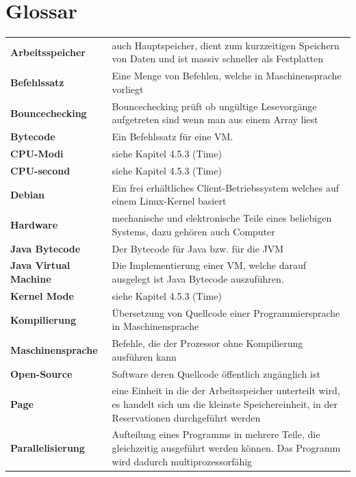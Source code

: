 \documentclass{fancydocument}
\begin{document}
\section{Glossar}
\renewcommand{\arraystretch}{1.4}
\begin{tabularx}{\linewidth}{p{6.5cm}X}
\textbf{Arbeitsspeicher}&auch Hauptspeicher, dient zum kurzzeitigen Speichern von Daten und ist massiv schneller als Festplatten\\
\textbf{Befehlssatz}&Eine Menge von Befehlen, welche in Maschinensprache vorliegt\\
\textbf{Bouncechecking}& Bouncechecking prüft ob ungültige Lesevorgänge aufgetreten sind wenn man aus einem Array liest\\
\textbf{Bytecode}&Ein Befehlssatz für eine VM.\\
\textbf{CPU-Modi}&siehe Kapitel 4.5.3 (Time)\\
\textbf{CPU-second}&siehe Kapitel 4.5.3 (Time)\\
\textbf{Debian}&Ein frei erhältliches Client-Betriebssystem welches auf einem Linux-Kernel basiert\\
\textbf{Hardware}&mechanische und elektronische Teile eines beliebigen Systems, dazu gehören auch Computer\\
\textbf{Java Bytecode}&Der Bytecode für Java bzw. für die JVM\\
\textbf{Java Virtual Machine}&Die Implementierung einer VM, welche darauf ausgelegt ist Java Bytecode auszuführen.\\
\textbf{Kernel Mode}&siehe Kapitel 4.5.3 (Time)\\
\textbf{Kompilierung}&Übersetzung von Quellcode einer Programmiersprache in Maschinensprache\\
\textbf{Maschinensprache}&Befehle, die der Prozessor ohne Kompilierung ausführen kann\\
\textbf{Open-Source}&Software deren Quellcode öffentlich zugänglich ist\\
\textbf{Page}&eine Einheit in die der Arbeitsspeicher unterteilt wird, es handelt sich um die kleinste Speichereinheit, in der Reservationen durchgeführt werden\\
\textbf{Parallelisierung}&Aufteilung eines Programms in mehrere Teile, die gleichzeitig ausgeführt werden können. Das Programm wird dadurch multiprozessorfähig\\
\end{tabularx}
\newpage
\noindent
\end{document}

